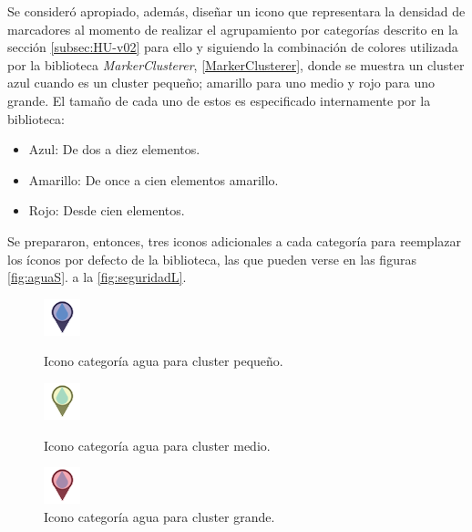 Se consideró apropiado, además, diseñar un icono que representara la densidad de marcadores al momento de realizar el agrupamiento por categorías descrito en la sección \ref{subsec:HU-v02} para ello y siguiendo la combinación de colores utilizada por la biblioteca \textit{MarkerClusterer}, \ref{MarkerClusterer}, donde se muestra un cluster azul cuando es un cluster pequeño; amarillo para uno medio y rojo para uno grande. El tamaño de cada uno de estos es especificado internamente por la biblioteca:

\begin{itemize}
\item Azul: De dos a diez elementos.
\item Amarillo: De once a cien elementos amarillo.
\item Rojo: Desde cien elementos.
\end{itemize}

Se prepararon, entonces, tres iconos adicionales a cada categoría para reemplazar los íconos por defecto de la biblioteca, las que pueden verse en las figuras \ref{fig:aguaS}. a la \ref{fig:seguridadL}.\\

\begin{figure}[H]
	\centering
	\captionsetup{justification=centering}
	\includegraphics[scale=1]{images/categorias/aguaS.png}
	\caption[Icono categoría agua para cluster pequeño.]{Icono categoría agua para cluster pequeño.}
	\label{fig:aguaS}
	\endminipage\hfill
	\centering
	\captionsetup{justification=centering}
	\includegraphics[scale=1]{images/categorias/aguaM.png}
	\caption[Icono categoría agua para cluster medio.]{Icono categoría agua para cluster medio.}
	\label{fig:aguaM}
	\endminipage\hfill
	\centering
	\captionsetup{justification=centering}
	\includegraphics[scale=1]{images/categorias/aguaL.png}
	\caption[Icono categoría agua para cluster grande.]{Icono categoría agua para cluster grande.}
	\label{fig:aguaL}
	\endminipage\hfill
\end{figure}

